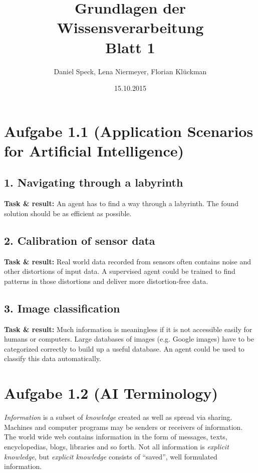 \documentclass[10pt,a4paper]{article}
\title{\textbf{\huge Grundlagen der Wissensverarbeitung
\\\Large Blatt 1}}
\author{Daniel Speck, Lena Niermeyer, Florian Klückman}
\date{15.10.2015}
\begin{document}
	\maketitle




	\section*{Aufgabe 1.1 (Application Scenarios for Artificial Intelligence)}
	
		\subsection*{1. Navigating through a labyrinth}
		
			\textbf{Task \& result:} An agent has to find a way through a labyrinth. The found solution should be as efficient as possible.
		
		\subsection*{2. Calibration of sensor data}
		
			\textbf{Task \& result:} Real world data recorded from sensors often contains noise and other distortions of input data. A supervised agent could be trained to find patterns in those distortions and deliver more distortion-free data.
		
		\subsection*{3. Image classification}
		
			\textbf{Task \& result:} Much information is meaningless if it is not accessible easily for humans or computers. Large databases of images (e.g. Google images) have to be categorized correctly to build up a useful database. An agent could be used to classify this data automatically.
	
	\section*{Aufgabe 1.2 (AI Terminology)}

		\textit{Information} is a subset of \textit{knowledge} created as well as spread via sharing. Machines and computer programs may be senders or receivers of information. The world wide web contains information in the form of messages, texts, encyclopedias, blogs, libraries and so forth. Not all information is \textit{explicit knowledge}, but \textit{explicit knowledge} consists of \enquote{saved}, well formulated information. 
		\\
\end{document}
